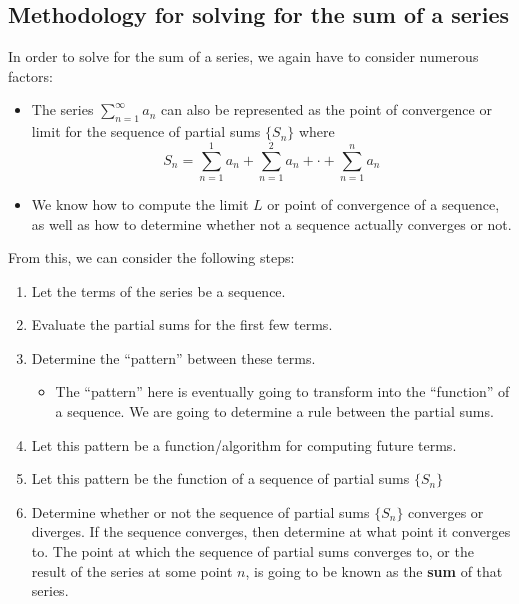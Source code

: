 \documentclass{report}
\begin{document}
\begin{sloppypar}
\subsection{Methodology for solving for the sum of a series}
In order to solve for the sum of a series, we again have
to consider numerous factors:
\begin{itemize}
  \item The series $ \sum_{n=1}^{\infty} a_{n}$ can also be represented as the point of convergence or limit for the sequence of partial sums $ \{ S_{n}\} $ where
        \[ S_{n} = \sum_{n=1}^{1} a_{n} + \sum_{n=1}^{2} a_{n} +
        \cdot + \sum_{n=1}^{n} a_{n}\]
  \item We know how to compute the limit $ L $ or point of
        convergence of a sequence, as well as how to
        determine whether not a sequence actually
        converges or not.
\end{itemize}
From this, we can consider the following steps:
\begin{enumerate}
  \item Let the terms of the series be a sequence.
  \item Evaluate the partial sums for the first few terms.
  \item Determine the ``pattern'' between these
        terms.
        \begin{itemize}
          \item The ``pattern'' here is eventually
                going to transform into the ``function'' of
                a sequence. We are going to determine a
                rule between the partial sums.
        \end{itemize}

  \item Let this pattern be a function/algorithm for
        computing future terms.
  \item Let this pattern be the function of a
        sequence of partial sums $ \{S_{n}\} $
  \item Determine whether or not the sequence of partial
        sums $ \{S_{n}\} $ converges or diverges. If the
        sequence converges, then determine at what point
        it converges to. The point at which the sequence
        of partial sums converges to, or the result of
        the series at some point $ n $, is going to be
        known as the \textbf{sum} of that series.

\end{enumerate}


\end{sloppypar}
\end{document}
